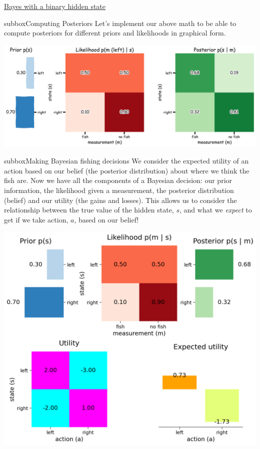 \begin{textbox}{\href{https://compneuro.neuromatch.io/tutorials/W3D1_BayesianDecisions/student/W3D1_Tutorial1.html}{Bayes with a binary hidden state } }
\begin{subbox}{subbox}{Computing Posteriors}
\scriptsize
Let's implement our above math to be able to compute posteriors for different priors and likelihoods in graphical form.

\centering
\includegraphics[scale=0.12]{Figures/BD/BD_Figure3.png}

 
\end{subbox}

\begin{subbox}{subbox}{Making Bayesian fishing decisions}
\scriptsize
We consider the expected utility of an action based on our belief (the posterior distribution) about where we think the fish are. Now we have all the components of a Bayesian decision: our prior information, the likelihood given a measurement, the posterior distribution (belief) and our utility (the gains and losses). This allows us to consider the relationship between the true value of the hidden state, $s$, and what we \textit{expect} to get if we take action, $a$, based on our belief!


\centering
\includegraphics[scale=0.25]{Figures/BD/BD_Figure4.png}

 
\end{subbox}
\end{textbox}

